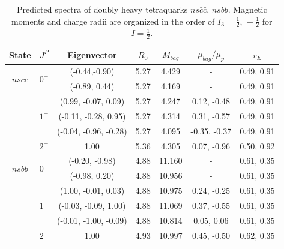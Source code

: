 \documentclass[prd,twocolumn,floatfix,nofootinbib]{revtex4}
\begin{document}
\renewcommand{\tabcolsep}{0.73cm}
\renewcommand{\arraystretch}{1.3}
\begin{table}[!htbp]
    \caption{Predicted spectra of doubly heavy tetraquarks $ns\bar{c}\bar{c}$, $ns\bar{b}\bar{b}$. 
    Magnetic moments and charge radii are organized in the order of $I_{3}=\frac{1}{2},\,-\frac{1}{2}$ for $I=\frac{1}{2}$.}
    \label{tab:2heavytetraquark1/2}
    \begin{tabular}{ccccccc}
        \hline\hline
        {\rm State}     &$J^{P}$    &{\rm Eigenvector}      &$R_{0}$    &$M_{bag}$  &$\mu_{bag}/\mu_{p}$    &$r_{E}$ \\ \hline
        \multirow{2}{*}{$ns\bar{c}\bar{c}$}
                        &\multirow{2}{*}{$0^{+}$}
                                    &(-0.44,-0.90)           &5.27	    &4.429	    &-                      &0.49, 0.91 \\ 
                        &           &(-0.89, 0.44)           &5.27	    &4.169	    &-                      &0.49, 0.91 \\ 
                        &\multirow{3}{*}{$1^{+}$}
                                    &(0.99, -0.07, 0.09)    &5.27	    &4.247	    &0.12, -0.48            &0.49, 0.91 \\ 
                        &           &(-0.11, -0.28, 0.95)   &5.27	    &4.314	    &0.31, -0.57            &0.49, 0.91 \\ 
                        &           &(-0.04, -0.96, -0.28)  &5.27	    &4.095	    &-0.35, -0.37           &0.49, 0.91 \\ 
                        &$2^{+}$    &1.00                   &5.36	    &4.305	    &0.07, -0.96            &0.50, 0.92 \\ 
        \multirow{2}{*}{$ns\bar{b}\bar{b}$}             
                        &\multirow{2}{*}{$0^{+}$}             
                                    &(-0.20, -0.98)         &4.88	    &11.160	    &-                      &0.61, 0.35 \\ 
                        &           &(-0.98, 0.20)          &4.88	    &10.956	    &-                      &0.61, 0.35 \\ 
                        &\multirow{3}{*}{$1^{+}$}
                                    &(1.00, -0.01, 0.03)    &4.88	    &10.975	    &0.24, -0.25            &0.61, 0.35 \\ 
                        &           &(-0.03, -0.09, 1.00)   &4.88	    &11.069	    &0.37, -0.55            &0.61, 0.35 \\ 
                        &           &(-0.01, -1.00, -0.09)  &4.88	    &10.814	    &0.05, 0.06             &0.61, 0.35 \\ 
                        &$2^{+}$    &1.00                   &4.93	    &10.997	    &0.45, -0.50            &0.62, 0.35 \\ 
        \hline\hline
    \end{tabular}
\end{table}
\end{document}

